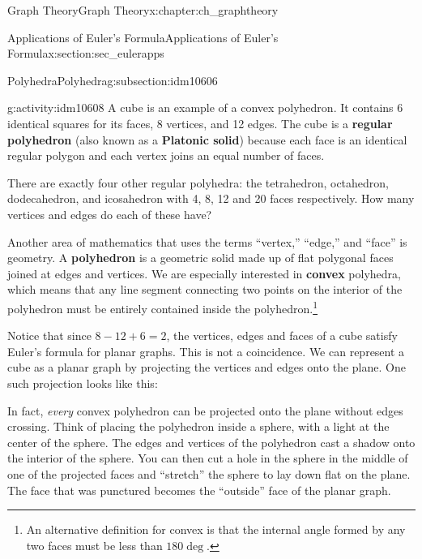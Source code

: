 \documentclass[oneside,10pt,]{book}
\newcommand{\terminology}[1]{\textbf{#1}}
\numberwithin{equation}{chapter}
\newcommand{\vtx}[2]{node[fill,circle,inner sep=0pt, minimum size=4pt,label=#1:#2]{}}
\renewcommand{\v}{\vtx{above}{}}
\begin{document}
\begin{chapterptx}{Graph Theory}{}{Graph Theory}{}{}{x:chapter:ch_graphtheory}
\begin{sectionptx}{Applications of Euler's Formula}{}{Applications of Euler's Formula}{}{}{x:section:sec_eulerapps}
\begin{subsectionptx}{Polyhedra}{}{Polyhedra}{}{}{g:subsection:idm10606}
\begin{activity}{}{g:activity:idm10608}
A cube is an example of a convex polyhedron. It contains 6 identical squares for its faces, 8 vertices, and 12 edges. The cube is a \terminology{regular polyhedron} (also known as a \terminology{Platonic solid}) because each face is an identical regular polygon and each vertex joins an equal number of faces.%
\par
There are exactly four other regular polyhedra: the tetrahedron, octahedron, dodecahedron, and icosahedron with 4, 8, 12 and 20 faces respectively. How many vertices and edges do each of these have?%
\end{activity}
Another area of mathematics that uses the terms ``vertex,'' ``edge,'' and ``face'' is geometry. A \terminology{polyhedron} is a geometric solid made up of flat polygonal faces joined at edges and vertices. We are especially interested in \terminology{convex} polyhedra, which means that any line segment connecting two points on the interior of the polyhedron must be entirely contained inside the polyhedron.\footnote{An alternative definition for convex is that the internal angle formed by any two faces must be less than \(180\deg\).\label{g:fn:idm10628}}%
\par
Notice that since \(8 - 12 + 6 = 2\), the vertices, edges and faces of a cube satisfy Euler's formula for planar graphs. This is not a coincidence. We can represent a cube as a planar graph by projecting the vertices and edges onto the plane. One such projection looks like this:%
\begin{sidebyside}{1}{0.4}{0.4}{0}%
\begin{sbspanel}{0.2}%
\resizebox{\linewidth}{!}{%
\begin{tikzpicture}
  \foreach \ang in {45, 135, 225, 315} {
  \draw (\ang:.4) \v -- (\ang:1) \v -- (\ang+90:1) (\ang:.4) -- (\ang+90:.4);
  }
  \end{tikzpicture}
}%
\end{sbspanel}%
\end{sidebyside}%
\par
In fact, \emph{every} convex polyhedron can be projected onto the plane without edges crossing. Think of placing the polyhedron inside a sphere, with a light at the center of the sphere. The edges and vertices of the polyhedron cast a shadow onto the interior of the sphere. You can then cut a hole in the sphere in the middle of one of the projected faces and ``stretch'' the sphere to lay down flat on the plane. The face that was punctured becomes the ``outside'' face of the planar graph.%

\end{subsectionptx}
\end{sectionptx}
\end{chapterptx}
\end{document}
